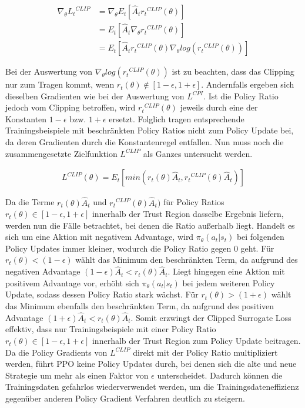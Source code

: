 \begin{equation}
\begin{aligned}
\nabla_\theta {L_t}^{CLIP}
&= \nabla_\theta E_t[\hat{A}_t {r_t}^{CLIP}(\theta)]\\
&= E_t[\hat{A}_t \nabla_\theta {r_t}^{CLIP}(\theta)]\\
&= E_t[\hat{A}_t {r_t}^{CLIP}(\theta) \nabla_\theta log({r_t}^{CLIP}(\theta))]
\end{aligned}
\end{equation}

Bei der Auswertung von $\nabla_\theta log({r_t}^{CLIP}(\theta))$ ist zu beachten,
dass das Clipping nur zum Tragen kommt, wenn $r_t(\theta) \notin [1 - \epsilon, 1 + \epsilon]$.
Andernfalls ergeben sich dieselben Gradienten wie bei der Auswertung von $L^{CPI}$.
Ist die Policy Ratio jedoch vom Clipping betroffen, wird ${r_t}^{CLIP}(\theta)$
jeweils durch eine der Konstanten $1 - \epsilon$ bzw. $1 + \epsilon$ ersetzt.
Folglich tragen entsprechende Trainingsbeispiele mit beschränkten Policy Ratios
nicht zum Policy Update bei, da deren Gradienten durch die Konstantenregel entfallen.
Nun muss noch die zusammengesetzte Zielfunktion $L^{CLIP}$ als Ganzes untersucht werden.

\begin{equation}
\begin{aligned}
L^{CLIP}(\theta) = E_t[min(r_t(\theta) \hat{A}_t, {r_t}^{CLIP}(\theta) \hat{A}_t)]
\end{aligned}
\end{equation}

Da die Terme $r_t(\theta) \hat{A}_t$ und ${r_t}^{CLIP}(\theta) \hat{A}_t)$ für Policy
Ratios $r_t(\theta) \in [1 - \epsilon, 1 + \epsilon]$ innerhalb der Trust Region dasselbe
Ergebnis liefern, werden nun die Fälle betrachtet, bei denen die Ratio außerhalb liegt.
Handelt es sich um eine Aktion mit negativem Advantage, wird $\pi_\theta(a_t | s_t)$
bei folgenden Policy Updates immer kleiner, wodurch die Policy Ratio gegen 0 geht.
Für $r_t(\theta) < (1 - \epsilon)$ wählt das Minimum den beschränkten Term, da aufgrund
des negativen Advantage $(1 - \epsilon) \hat{A}_t < r_t(\theta) \hat{A}_t$.
Liegt hingegen eine Aktion mit positivem Advantage vor, erhöht sich $\pi_\theta(a_t | s_t)$
bei jedem weiteren Policy Update, sodass dessen Policy Ratio stark wächst.
Für $r_t(\theta) > (1 + \epsilon)$ wählt das Minimum ebenfalls den beschränkten Term,
da aufgrund des positiven Advantage $(1 + \epsilon) \hat{A}_t < r_t(\theta) \hat{A}_t$.
Somit erzwingt der Clipped Surrogate Loss effektiv, dass nur Trainingsbeispiele mit einer
Policy Ratio $r_t(\theta) \in [1 - \epsilon, 1 + \epsilon]$ innerhalb der Trust Region zum
Policy Update beitragen. Da die Policy Gradients von $L^{CLIP}$ direkt mit der Policy Ratio
multipliziert werden, führt PPO keine Policy Updates durch, bei denen sich die alte und
neue Strategie um mehr als einen Faktor von $\epsilon$ unterscheidet. Dadurch können
die Trainingsdaten gefahrlos wiederverwendet werden, um die Trainingsdateneffizienz
gegenüber anderen Policy Gradient Verfahren deutlich zu steigern.\\

